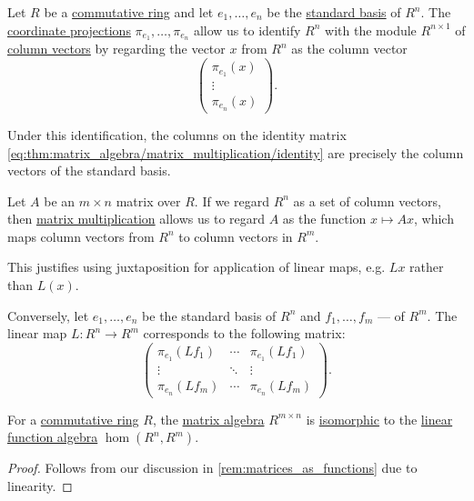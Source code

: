 \begin{remark}\label{rem:matrices_as_functions}
  Let \( R \) be a \hyperref[def:ring/commutative]{commutative ring} and let \( e_1, \ldots, e_n \) be the \hyperref[def:coordinate_space]{standard basis} of \( R^n \). The \hyperref[def:basis_decomposition]{coordinate projections} \( \pi_{e_1}, \ldots, \pi_{e_n} \) allow us to identify \( R^n \) with the module \( R^{n \times 1} \) of \hyperref[def:array/column_vector]{column vectors} by regarding the vector \( x \) from \( R^n \) as the column vector
  \begin{equation*}
    \begin{pmatrix}
      \pi_{e_1}(x) \\
      \vdots \\
      \pi_{e_n}(x)
    \end{pmatrix}.
  \end{equation*}

  Under this identification, the columns on the identity matrix \eqref{eq:thm:matrix_algebra/matrix_multiplication/identity} are precisely the column vectors of the standard basis.

  Let \( A \) be an \( m \times n \) matrix over \( R \). If we regard \( R^n \) as a set of column vectors, then \hyperref[thm:matrix_algebra/matrix_multiplication]{matrix multiplication} allows us to regard \( A \) as the function \( x \mapsto Ax \), which maps column vectors from \( R^n \) to column vectors in \( R^m \).

  This justifies using juxtaposition for application of linear maps, e.g. \( Lx \) rather than \( L(x) \).

  Conversely, let \( e_1, \ldots, e_n \) be the standard basis of \( R^n \) and \( f_1, \ldots, f_m \) --- of \( R^m \). The linear map \( L: R^n \to R^m \) corresponds to the following matrix:
  \begin{equation*}
    \begin{pmatrix}
      \pi_{e_1}(L f_1) & \cdots & \pi_{e_1}(L f_1) \\
      \vdots           & \ddots & \vdots       \\
      \pi_{e_n}(L f_m) & \cdots & \pi_{e_n}(L f_m)
    \end{pmatrix}.
  \end{equation*}
\end{remark}

\begin{proposition}\label{thm:matrix_and_linear_function_algebras}
  For a \hyperref[def:ring/commutative]{commutative ring} \( R \), the \hyperref[thm:matrix_algebra]{matrix algebra} \( R^{m \times n} \) is \hyperref[def:algebra_over_semiring/morphism]{isomorphic} to the \hyperref[def:fol_structure_of_functions]{linear function algebra} \( \hom(R^n, R^m) \).
\end{proposition}
\begin{proof}
  Follows from our discussion in \cref{rem:matrices_as_functions} due to linearity.
\end{proof}

